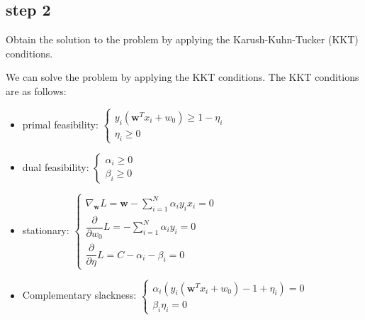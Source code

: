 \subsection{step 2}
Obtain the solution to the problem by applying the Karush-Kuhn-Tucker (KKT) conditions.
\begin{qsolve}
	\begin{qsolve}[]
		We can solve the problem by applying the KKT conditions. The KKT conditions are as follows:
		\begin{itemize}
			\item primal feasibility:
			$
			\left\{
			\begin{array}{ll}
				y_i(\textbf{w}^Tx_i + w_0) \geq 1 - \eta_i\\
				\eta_i \geq 0
			\end{array}
			\right.
			$
			\item dual feasibility:
			$
			\left\{
			\begin{array}{ll}
				\alpha_i \geq 0\\
				\beta_i \geq 0
			\end{array}
			\right.
			$
			\item stationary:
			$
			\left\{
			\begin{array}{ll}
				\nabla_{\textbf{w}}L = \textbf{w} - \sum\limits_{i=1}^{N}\alpha_iy_ix_i = 0\\
				\dfrac{\partial}{\partial w_0}L = -\sum\limits_{i=1}^{N}\alpha_iy_i = 0\\
				\dfrac{\partial }{\partial \eta}L = C - \alpha_i - \beta_i = 0
			\end{array}
			\right.
			$
			\item Complementary slackness:
			$
			\left\{
			\begin{array}{ll}
				\alpha_i(y_i(\textbf{w}^Tx_i + w_0) - 1 + \eta_i) = 0\\
				\beta_i\eta_i = 0
			\end{array}
			\right.
			$
		\end{itemize}

	\end{qsolve}
\end{qsolve}